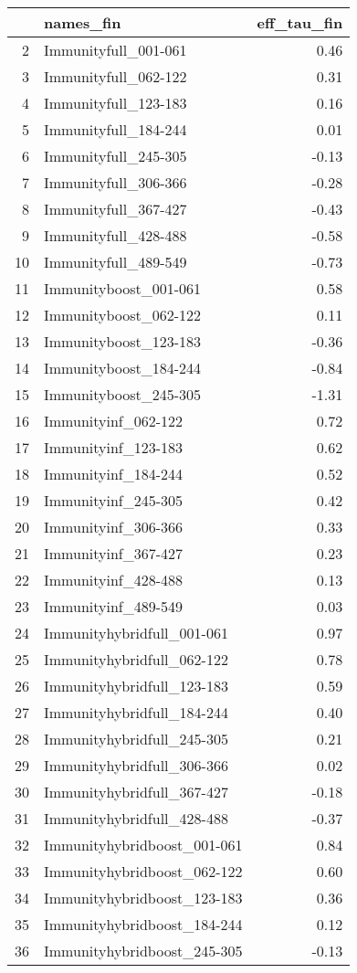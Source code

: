 \begin{table}[ht]
\centering
\begin{tabular}{rlr}
  \hline
 & names\_fin & eff\_tau\_fin \\ 
  \hline
2 & Immunityfull\_001-061 & 0.46 \\ 
  3 & Immunityfull\_062-122 & 0.31 \\ 
  4 & Immunityfull\_123-183 & 0.16 \\ 
  5 & Immunityfull\_184-244 & 0.01 \\ 
  6 & Immunityfull\_245-305 & -0.13 \\ 
  7 & Immunityfull\_306-366 & -0.28 \\ 
  8 & Immunityfull\_367-427 & -0.43 \\ 
  9 & Immunityfull\_428-488 & -0.58 \\ 
  10 & Immunityfull\_489-549 & -0.73 \\ 
  11 & Immunityboost\_001-061 & 0.58 \\ 
  12 & Immunityboost\_062-122 & 0.11 \\ 
  13 & Immunityboost\_123-183 & -0.36 \\ 
  14 & Immunityboost\_184-244 & -0.84 \\ 
  15 & Immunityboost\_245-305 & -1.31 \\ 
  16 & Immunityinf\_062-122 & 0.72 \\ 
  17 & Immunityinf\_123-183 & 0.62 \\ 
  18 & Immunityinf\_184-244 & 0.52 \\ 
  19 & Immunityinf\_245-305 & 0.42 \\ 
  20 & Immunityinf\_306-366 & 0.33 \\ 
  21 & Immunityinf\_367-427 & 0.23 \\ 
  22 & Immunityinf\_428-488 & 0.13 \\ 
  23 & Immunityinf\_489-549 & 0.03 \\ 
  24 & Immunityhybridfull\_001-061 & 0.97 \\ 
  25 & Immunityhybridfull\_062-122 & 0.78 \\ 
  26 & Immunityhybridfull\_123-183 & 0.59 \\ 
  27 & Immunityhybridfull\_184-244 & 0.40 \\ 
  28 & Immunityhybridfull\_245-305 & 0.21 \\ 
  29 & Immunityhybridfull\_306-366 & 0.02 \\ 
  30 & Immunityhybridfull\_367-427 & -0.18 \\ 
  31 & Immunityhybridfull\_428-488 & -0.37 \\ 
  32 & Immunityhybridboost\_001-061 & 0.84 \\ 
  33 & Immunityhybridboost\_062-122 & 0.60 \\ 
  34 & Immunityhybridboost\_123-183 & 0.36 \\ 
  35 & Immunityhybridboost\_184-244 & 0.12 \\ 
  36 & Immunityhybridboost\_245-305 & -0.13 \\ 
   \hline
\end{tabular}
\end{table}
